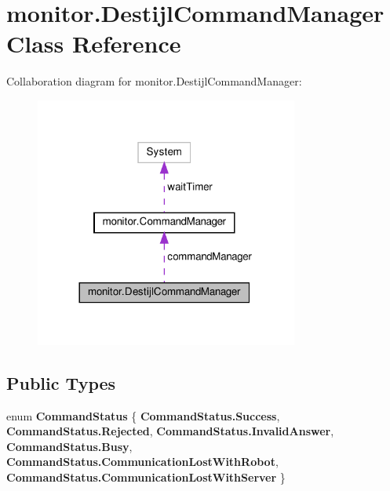 \section{monitor.\+Destijl\+Command\+Manager Class Reference}
\label{classmonitor_1_1_destijl_command_manager}


Collaboration diagram for monitor.\+Destijl\+Command\+Manager\+:
\nopagebreak
\begin{figure}[H]
\begin{center}
\leavevmode
\includegraphics[width=245pt]{classmonitor_1_1_destijl_command_manager__coll__graph}
\end{center}
\end{figure}
\subsection*{Public Types}
\begin{DoxyCompactItemize}
\item 
enum \textbf{ Command\+Status} \{ \newline
\textbf{ Command\+Status.\+Success}, 
\textbf{ Command\+Status.\+Rejected}, 
\textbf{ Command\+Status.\+Invalid\+Answer}, 
\textbf{ Command\+Status.\+Busy}, 
\newline
\textbf{ Command\+Status.\+Communication\+Lost\+With\+Robot}, 
\textbf{ Command\+Status.\+Communication\+Lost\+With\+Server}
 \}
\end{DoxyCompactItemize}
